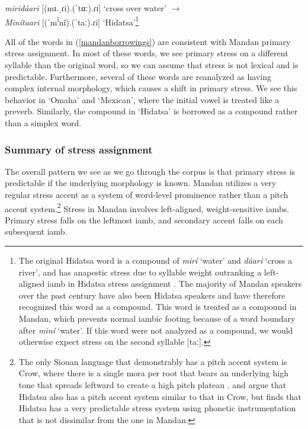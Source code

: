 \begin{exe}
\begin{xlist}
\textit{miridáari} [(mɪ.ˌɾi).(ˈtɑː).ɾɪ] `cross over water' $\to$\\
	\textit{Minítaari} [(ˈm\textsuperscript{ĩ}nĩ).(ˈtaː).ɾi] `Hidatsa'\footnote{The original Hidatsa word is a compound of \textit{mirí} `water' and \textit{dáari} `cross a river', and has anapestic stress due to syllable weight outranking a left-aligned iamb in Hidatsa stress assignment \citep{boyleetal2016}. The majority of Mandan speakers over the past century have also been Hidatsa speakers and have therefore recognized this word as a compound. This word is treated as a compound in Mandan, which prevents normal iambic footing because of a word boundary after \textit{miní} `water'. If this word were not analyzed as a compound, we would otherwise expect stress on the second syllable [taː].}

\end{xlist}

\end{exe}

All of the words in (\ref{mandanborrowings}) are consistent with Mandan primary stress assignment. In most of these words, we see primary stress on a different syllable than the original word, so we can assume that stress is not lexical and is predictable. Furthermore, several of these words are reanalyzed as having complex internal morphology, which causes a shift in primary stress. We see this behavior in `Omaha' and `Mexican', where the initial vowel is treated like a preverb. Similarly, the compound in `Hidatsa' is borrowed as a compound rather than a simplex word.

\subsubsection{Summary of stress assignment}

The overall pattern we see as we go through the corpus is that primary stress is predictable if the underlying morphology is known. Mandan utilizes a very regular stress accent as a system of word-level prominence rather than a pitch accent system.\footnote{The only Siouan language that demonstrably has a pitch accent system is Crow, where there is a single mora per root that bears an underlying high tone that spreads leftward to create a high pitch plateau \citep{graczyk2007,wallace1993}. \citet{boyle2007} and \citet{park2012} argue that Hidatsa also has a pitch accent system similar to that in Crow, but \citet{boyleetal2016} finds that Hidatsa has a very predictable stress system using phonetic instrumentation that is not dissimilar from the one in Mandan.} Stress in Mandan involves left-aligned, weight-sensitive iambs. Primary stress falls on the leftmost iamb, and secondary accent falls on each subsequent iamb.

